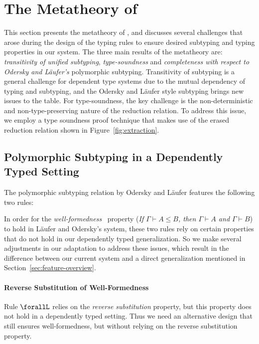\section{The Metatheory of \name}
\label{sec:metatheory}

This section presents the metatheory of \name, and discusses several challenges
that arose during the design of the typing rules to ensure desired subtyping and
typing properties in our system.
The three main results of the metatheory are:
\emph{transitivity of unified subtyping}, \emph{type-soundness} and
\emph{completeness with respect to Odersky and L\"aufer's} polymorphic
subtyping. Transitivity of subtyping is a general challenge for dependent type systems due
to the mutual dependency of typing and subtyping, and the Odersky and L\"aufer style
subtyping brings new issues to the table. For type-soundness, the key challenge
is the non-deterministic and non-type-preserving nature of the reduction relation.
To address this issue, we employ a type soundness proof technique
that makes use of the erased reduction relation shown in Figure~\ref{fig:extraction}.

\subsection{Polymorphic Subtyping in a Dependently Typed Setting}
\label{sec:adaptation}

The polymorphic subtyping relation by Odersky and L\"aufer features the following two rules:
In order for the \emph{well-formedness}~\citep{dunfield2013lemmas} property
(\emph{If $\Gamma \vdash A \le B$, then $\Gamma \vdash A$ and $\Gamma \vdash B$})
to hold in L\"aufer and Odersky's system, these two rules rely on certain properties
that do not hold in our dependently typed generalization. So we make several adjustments
in our adaptation to address these issues, which result in the difference between
our current system and a direct generalization mentioned in Section~\ref{sec:feature-overview}.

\paragraph*{Reverse Substitution of Well-Formedness}
\label{sec:reverse-subst}
Rule $\forallL$ relies on the \emph{reverse substitution} property, but this property
does not hold in a dependently typed setting. Thus we need an alternative design that
still ensures well-formedness, but without relying on the reverse substitution property.


